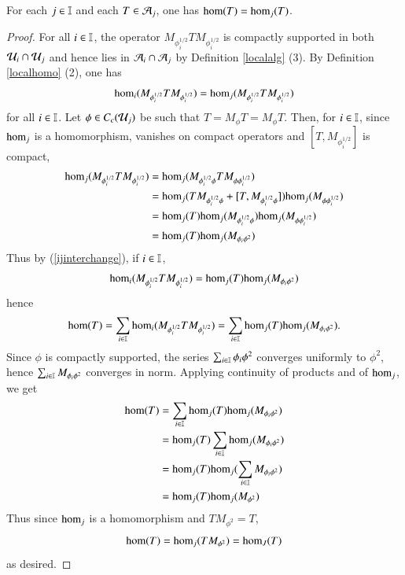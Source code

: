 \documentclass[leqno]{amsart}
\begin{document}
	\begin{proposition}\label{globalisation-equal}
		For each $j\in\mathbb I$ and each $T\in{\mathcal A}_j$, one has ${\rm hom}(T)={\rm hom}_j(T)$.
	\end{proposition}
	\begin{proof}
		For all $i\in\mathbb I$, the operator $M_{\phi_i^{1/2}}TM_{\phi_i^{1/2}}$ is compactly supported in both ${\mathcal U}_i\cap {\mathcal U}_j$ and hence lies in ${\mathcal A}_i\cap{\mathcal A}_j$ by Definition \ref{localalg} (3). By Definition \ref{localhomo} (2), one has
		\begin{equation}\label{ijinterchange}
			{\rm hom}_i(M_{\phi_i^{1/2}}TM_{\phi_i^{1/2}})={\rm hom}_j(M_{\phi_i^{1/2}}TM_{\phi_i^{1/2}})
		\end{equation}
		for all $i\in\mathbb I$. Let $\phi\in C_c({\mathcal U}_j)$ be such that $T=M_\phi T=M_\phi T$. Then, for $i\in\mathbb I$, since ${\rm hom}_j$ is a homomorphism, vanishes on compact operators and $[T, M_{\phi_i^{1/2}}]$ is compact,
		\begin{align*}
			{\rm hom}_j(M_{\phi_i^{1/2}}TM_{\phi_i^{1/2}})&={\rm hom}_j(M_{\phi_i^{1/2}\phi}TM_{\phi\phi_i^{1/2}})\\
			&={\rm hom}_j(TM_{\phi_i^{1/2}\phi}+[T, M_{\phi_i^{1/2}\phi}]){\rm hom}_j(M_{\phi\phi_i^{1/2}})\\
			&={\rm hom}_j(T){\rm hom}_j(M_{\phi_i^{1/2}\phi}){\rm hom}_j(M_{\phi\phi_i^{1/2}})\\
			&={\rm hom}_j(T){\rm hom}_j(M_{\phi_i\phi^2})
		\end{align*}
		Thus by (\ref{ijinterchange}), if $i\in\mathbb I$,
		$${\rm hom}_i(M_{\phi_i^{1/2}}TM_{\phi_i^{1/2}})={\rm hom}_j(T){\rm hom}_j(M_{\phi_i\phi^2})$$
		hence
		\begin{align*}
			{\rm hom}(T)=\sum_{i\in\mathbb I} {\rm hom}_i(M_{\phi_i^{1/2}}TM_{\phi_i^{1/2}})=\sum_{i\in\mathbb I} {\rm hom}_j(T){\rm hom}_j(M_{\phi_i\phi^2}).
		\end{align*}
		Since $\phi$ is compactly supported, the series $\sum_{i\in\mathbb I} \phi_i\phi^2$ converges uniformly to $\phi^2$, hence $\sum_{i\in\mathbb I} M_{\phi_i\phi^2}$ converges in norm. Applying continuity of products and of ${\rm hom}_j$, we get
		\begin{align*}
			{\rm hom}(T)&=\sum_{i\in\mathbb I} {\rm hom}_j(T){\rm hom}_j(M_{\phi_i\phi^2})\\
			&={\rm hom}_j(T)\sum_{i\in\mathbb I} {\rm hom}_j(M_{\phi_i\phi^2})\\
			&={\rm hom}_j(T) {\rm hom}_j(\sum_{i\in\mathbb I}M_{\phi_i\phi^2})\\
			&={\rm hom}_j(T) {\rm hom}_j(M_{\phi^2})
		\end{align*}
		Thus since ${\rm hom}_j$ is a homomorphism and $TM_{\phi^2}=T$,
		$${\rm hom}(T)={\rm hom}_j(TM_{\phi^2})={\rm hom}_J(T)$$
		as desired.
	\end{proof}
	
\end{document}
